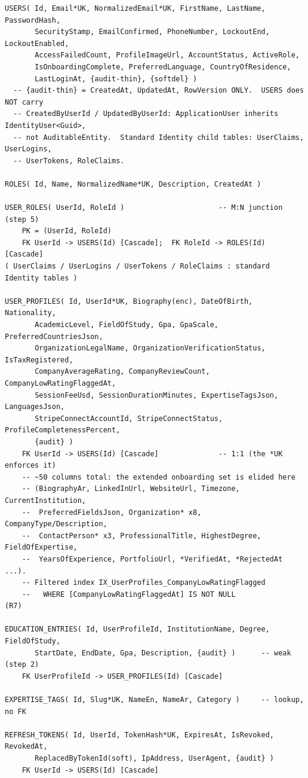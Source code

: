 \documentclass[11pt,a4paper]{article}
\begin{document}
{\footnotesize\begin{verbatim}
USERS( Id, Email*UK, NormalizedEmail*UK, FirstName, LastName, PasswordHash,
       SecurityStamp, EmailConfirmed, PhoneNumber, LockoutEnd, LockoutEnabled,
       AccessFailedCount, ProfileImageUrl, AccountStatus, ActiveRole,
       IsOnboardingComplete, PreferredLanguage, CountryOfResidence,
       LastLoginAt, {audit-thin}, {softdel} )
  -- {audit-thin} = CreatedAt, UpdatedAt, RowVersion ONLY.  USERS does NOT carry
  -- CreatedByUserId / UpdatedByUserId: ApplicationUser inherits IdentityUser<Guid>,
  -- not AuditableEntity.  Standard Identity child tables: UserClaims, UserLogins,
  -- UserTokens, RoleClaims.

ROLES( Id, Name, NormalizedName*UK, Description, CreatedAt )

USER_ROLES( UserId, RoleId )                      -- M:N junction (step 5)
    PK = (UserId, RoleId)
    FK UserId -> USERS(Id) [Cascade];  FK RoleId -> ROLES(Id) [Cascade]
( UserClaims / UserLogins / UserTokens / RoleClaims : standard Identity tables )

USER_PROFILES( Id, UserId*UK, Biography(enc), DateOfBirth, Nationality,
       AcademicLevel, FieldOfStudy, Gpa, GpaScale, PreferredCountriesJson,
       OrganizationLegalName, OrganizationVerificationStatus, IsTaxRegistered,
       CompanyAverageRating, CompanyReviewCount, CompanyLowRatingFlaggedAt,
       SessionFeeUsd, SessionDurationMinutes, ExpertiseTagsJson, LanguagesJson,
       StripeConnectAccountId, StripeConnectStatus, ProfileCompletenessPercent,
       {audit} )
    FK UserId -> USERS(Id) [Cascade]              -- 1:1 (the *UK enforces it)
    -- ~50 columns total: the extended onboarding set is elided here
    -- (BiographyAr, LinkedInUrl, WebsiteUrl, Timezone, CurrentInstitution,
    --  PreferredFieldsJson, Organization* x8, CompanyType/Description,
    --  ContactPerson* x3, ProfessionalTitle, HighestDegree, FieldOfExpertise,
    --  YearsOfExperience, PortfolioUrl, *VerifiedAt, *RejectedAt ...).
    -- Filtered index IX_UserProfiles_CompanyLowRatingFlagged
    --   WHERE [CompanyLowRatingFlaggedAt] IS NOT NULL                 (R7)

EDUCATION_ENTRIES( Id, UserProfileId, InstitutionName, Degree, FieldOfStudy,
       StartDate, EndDate, Gpa, Description, {audit} )      -- weak (step 2)
    FK UserProfileId -> USER_PROFILES(Id) [Cascade]

EXPERTISE_TAGS( Id, Slug*UK, NameEn, NameAr, Category )     -- lookup, no FK

REFRESH_TOKENS( Id, UserId, TokenHash*UK, ExpiresAt, IsRevoked, RevokedAt,
       ReplacedByTokenId(soft), IpAddress, UserAgent, {audit} )
    FK UserId -> USERS(Id) [Cascade]


\end{verbatim}}
\end{document}

